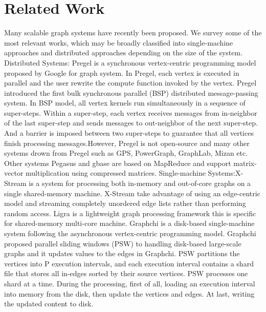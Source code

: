 \documentclass[twocolumn,a4paper,10pt]{article}
\begin{document}
\section{Related Work}
Many scalable graph systems have recently been proposed. We survey some of the most relevant works, which may be broadly classified into single-machine approaches and distributed approaches depending on the size of the system.
\newline
	Distributed Systems: Pregel is a synchronous vertex-centric programming model proposed by Google for graph system. In Pregel, each vertex is executed in parallel and the user rewrite the compute function invoked by the vertex. Pregel introduced the first bulk synchronous parallel (BSP) distributed message-passing system. In BSP model, all vertex kernels run simultaneously in a sequence of super-steps. Within a super-step, each vertex receives messages from in-neighbor of the last super-step and sends messages to out-neighbor of the next super-step. And a barrier is imposed between two super-steps to guarantee that all vertices finish processing messages.However, Pregel is not open-source and many other systems drown from Pregel such as GPS, PowerGraph, GraphLab, Mizan etc. Other systems Pegasus and gbase are based on MapReduce and support matrix-vector multiplication using compressed matrices.
\newline
Single-machine Systems:X-Stream is a system for processing both in-memory and out-of-core graphs on a single shared-memory machine. X-Stream take advantage of using an edge-centric model and streaming completely unordered edge lists rather than performing random access. Ligra is a lightweight graph processing framework this is specific for shared-memory multi-core machine. Graphchi is a disk-based single-machine system following the asynchronous vertex-centric programming model. Graphchi proposed parallel sliding windows (PSW) to handling disk-based large-scale graphs and it updates values to the edges in Graphchi. PSW partitions the vertices into P execution intervals, and each execution interval contains a shard file that stores all in-edges sorted by their source vertices. PSW processes one shard at a time. During the processing, first of all, loading an execution interval into memory from the disk, then update the vertices and edges. At last, writing the updated content to disk.
\end{document}
